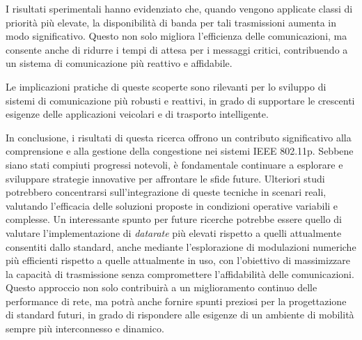 I risultati sperimentali hanno evidenziato che, quando vengono applicate classi di priorità più elevate, la disponibilità di banda per tali trasmissioni aumenta in modo significativo. Questo non solo migliora l'efficienza delle comunicazioni, ma consente anche di ridurre i tempi di attesa per i messaggi critici, contribuendo a un sistema di comunicazione più reattivo e affidabile.

Le implicazioni pratiche di queste scoperte sono rilevanti per lo sviluppo di sistemi di comunicazione più robusti e reattivi, in grado di supportare le crescenti esigenze delle applicazioni veicolari e di trasporto intelligente.

In conclusione, i risultati di questa ricerca offrono un contributo significativo alla comprensione e alla gestione della congestione nei sistemi IEEE 802.11p. Sebbene siano stati compiuti progressi notevoli, è fondamentale continuare a esplorare e sviluppare strategie innovative per affrontare le sfide future. Ulteriori studi potrebbero concentrarsi sull'integrazione di queste tecniche in scenari reali, valutando l'efficacia delle soluzioni proposte in condizioni operative variabili e complesse. Un interessante spunto per future ricerche potrebbe essere quello di valutare l'implementazione di \textit{datarate} più elevati rispetto a quelli attualmente consentiti dallo standard, anche mediante l'esplorazione di modulazioni numeriche più efficienti rispetto a quelle attualmente in uso, con l'obiettivo di massimizzare la capacità di trasmissione senza compromettere l'affidabilità delle comunicazioni. Questo approccio non solo contribuirà a un miglioramento continuo delle performance di rete, ma potrà anche fornire spunti preziosi per la progettazione di standard futuri, in grado di rispondere alle esigenze di un ambiente di mobilità sempre più interconnesso e dinamico.
